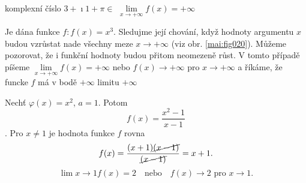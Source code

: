 \documentclass{scrbook}
\begin{document}
komplexní číslo \(3 + \imath1 +\pi ∈\) \(\lim\limits_{x\to+\infty}f(x) = +\infty\) 

Je dána funkce \(f: f(x) = x^3\). Sledujme její chování, když hodnoty argumentu \(x\) budou vzrůstat
nade všechny meze \(x \to + \infty\) (viz obr. \ref{mai:fig020}). Můžeme pozorovat, že i funkční
hodnoty budou přitom neomezeně růst. V tomto případě píšeme \(\lim\limits_{x\to+\infty}f(x) =
+\infty\) nebo \(f(x)\to+\infty\) pro  \(x\to+\infty\) a říkáme, že funcke \(f\) má v bodě
\(+\infty\) limitu \(+\infty\)

Nechť \(\varphi(x) = x^2\), \(a = 1\). Potom \[f(x) = \dfrac{x^2 - 1}{x - 1}\]. Pro \(x \neq 1\)
je hodnota funkce \(f\) rovna 
\begin{equation*}
  f(x) = \dfrac{(x + 1)\cancel{(x - 1 )}}{\cancel{(x - 1)}} = x + 1. 
\end{equation*}
\begin{equation*}
  \lim\limits{x\to1}f(x)=2    \quad\text{nebo}\quad 
  f(x) \to 2                   \text{ pro }  x\to 1.
\end{equation*}
\end{document}

